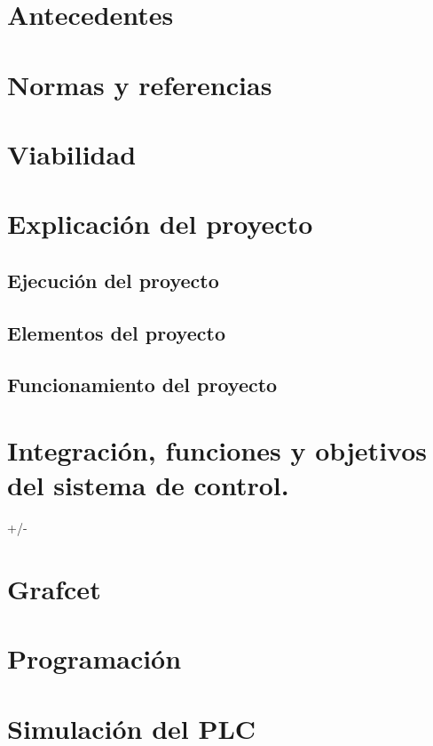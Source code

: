 \documentclass[spanish,openany]{report}
\begin{document}
	\section{Antecedentes}

	\section{Normas y referencias}

	\section{Viabilidad}

	\section{Explicación del proyecto}

		\subsection{Ejecución del proyecto}

		\subsection{Elementos del proyecto}

		\subsection{Funcionamiento del proyecto}

	\section{Integración, funciones y objetivos del sistema de control.}
		+/- 

\section{Grafcet}

\section{Programación}

\section{Simulación del PLC }
\end{document}
